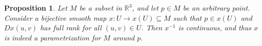 \documentclass{article}
\theoremstyle{plain}
\newtheorem{proposition}{Proposition}
\begin{document}
\begin{proposition}
Let $M$ be a subset in $\mathbb R^3$, and let $p \in M$ be an arbitrary point. Consider a bijective smooth map $x : U \to x(U) \subseteq M$ such that $p \in x(U)$ and $D x(u,v)$ has full rank for all $(u,v) \in U$. Then $x^{-1}$ is continuous, and thus $x$ is indeed a parametrization for $M$ around $p$.
\end{proposition}
\end{document}
